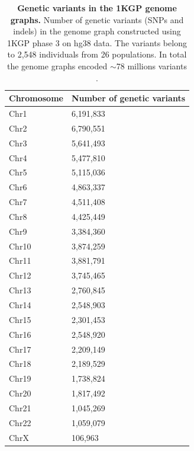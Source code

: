 \documentclass[a4paper, titlepage, openright]{book}
\begin{document}
\begin{table}[!]
    \centering
    \begin{tabular}{|p{4cm}|p{6cm}|}
        \hline
        \textbf{Chromosome} & \textbf{Number of genetic variants} \\
        \hline
        Chr1 & 6,191,833\\
        \hline
        Chr2 & 6,790,551\\
        \hline
        Chr3 & 5,641,493\\
        \hline
        Chr4 & 5,477,810\\
        \hline
        Chr5 & 5,115,036\\
        \hline
        Chr6 & 4,863,337\\
        \hline
        Chr7 & 4,511,408\\
        \hline
        Chr8 & 4,425,449\\
        \hline
        Chr9 & 3,384,360\\
        \hline
        Chr10 & 3,874,259\\
        \hline
        Chr11 & 3,881,791\\
        \hline
        Chr12 & 3,745,465\\
        \hline
        Chr13 & 2,760,845\\
        \hline
        Chr14 & 2,548,903\\
        \hline
        Chr15 & 2,301,453\\
        \hline
        Chr16 & 2,548,920\\
        \hline
        Chr17 & 2,209,149\\
        \hline
        Chr18 & 2,189,529\\
        \hline
        Chr19 & 1,738,824\\
        \hline
        Chr20 & 1,817,492\\
        \hline
        Chr21 & 1,045,269\\
        \hline
        Chr22 & 1,059,079\\
        \hline
        ChrX & 106,963\\
        \hline
    \end{tabular}
    \caption[Genetic variants in the 1KGP genome graphs]{\textbf{Genetic variants in the 1KGP genome graphs.} Number of genetic variants (SNPs and indels) in the genome graph constructed using 1KGP phase 3 on hg38 data. The variants belong to 2,548 individuals from 26 populations. In total the genome graphs encoded $\sim$78 millions variants\\ \hfill.}
    \label{table-1KGP-variants}
\end{table}
\end{document}
